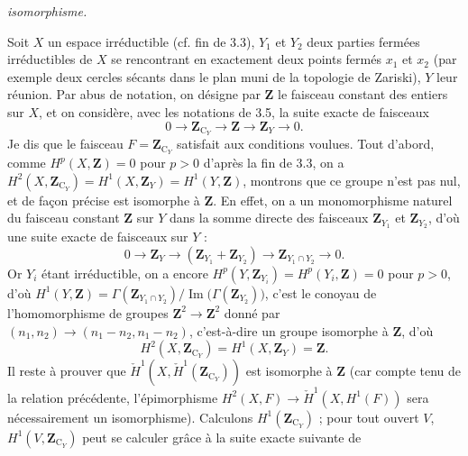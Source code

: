 
\noindent\textit{isomorphisme.}

Soit $X$ un espace irréductible (cf. fin de 3.3), $Y_1$ et $Y_2$ deux parties
fermées irréductibles de $X$ se rencontrant en exactement deux points fermés $x_1$ et
$x_2$ (par exemple deux cercles sécants dans le plan muni de la topologie de
Zariski), $Y$ leur réunion. Par abus de notation, on désigne par $\mathbf Z$ le
faisceau constant des entiers sur $X$, et on considère, avec les notations de
3.5, la suite exacte de faisceaux
\[
0\to\mathbf Z_{\mathrm C_Y}\to\mathbf Z
\to\mathbf Z_Y\to 0.
\]
Je dis que le faisceau $F=\mathbf Z_{\mathrm C_Y}$ satisfait aux conditions voulues.
Tout d'abord, comme $H^p(X,\mathbf Z)=0$ pour $p>0$ d'après la fin de 3.3, on a
$H^2(X,\mathbf Z_{\mathrm C_Y})=H^1(X,\mathbf Z_Y)=H^1(Y,\mathbf Z)$, montrons que ce
groupe n'est pas nul, et de façon précise est isomorphe à $\mathbf Z$. En
effet, on a un monomorphisme naturel du faisceau constant $\mathbf Z$ sur $Y$
dans la somme directe des faisceaux $\mathbf Z_{Y_1}$ et $\mathbf Z_{Y_2}$,
d'où une suite exacte de faisceaux sur $Y$ :
\[
0\to\mathbf Z_Y
\to(\mathbf Z_{Y_1}+\mathbf Z_{Y_2})
\to\mathbf Z_{Y_1\cap Y_2}\to 0.
\]
Or $Y_i$ étant irréductible, on a encore
$H^p(Y,\mathbf Z_{Y_i})=H^p(Y_i,\mathbf Z)=0$ pour $p>0$, d'où
$H^1(Y,\mathbf Z)
=\Gamma(\mathbf Z_{Y_1\cap Y_2})/
\operatorname{Im}\bigl(\Gamma(\mathbf Z_{Y_2})\bigr)$,
c'est le conoyau de l’homomorphisme de groupes
$\mathbf Z^2\to\mathbf Z^2$ donné par
$(n_1,n_2)\to(n_1-n_2,n_1-n_2)$, c'est-à-dire un groupe isomorphe à
$\mathbf Z$, d'où
\[
H^2(X,\mathbf Z_{\mathrm C_Y})=H^1(X,\mathbf Z_Y)=\mathbf Z.
\]
Il reste à prouver que $\check H^1(X,\check H^1(\mathbf Z_{\mathrm C_Y}))$ est isomorphe à
$\mathbf Z$ (car compte tenu de la relation précédente, l'épimorphisme
$H^2(X,F)\to\check H^1(X,H^1(F))$ sera nécessairement un
isomorphisme). Calculons $H^1(\mathbf Z_{\mathrm C_Y})$ ; pour tout ouvert $V$,
$H^1(V,\mathbf Z_{\mathrm C_Y})$ peut se calculer grâce à la suite exacte suivante de
